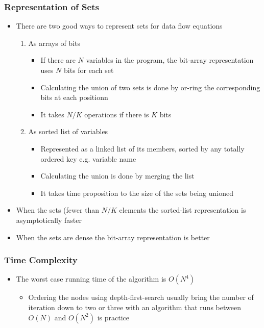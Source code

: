 \documentclass[11pt]{article}
\begin{document}
\subsubsection{Representation of Sets}
\label{sec:org340d9e2}
\begin{itemize}
\item There are two good ways to represent sets for data flow equations
\begin{enumerate}
\item As arrays of bits
\begin{itemize}
\item If there are \(N\) variables in the program, the bit-array representation uses \(N\) bits for each set
\item Calculating the union of two sets is done by or-ring the corresponding bits at each positionn
\item It takes \(N/K\) operations if there is \(K\) bits
\end{itemize}
\item As sorted list of variables
\begin{itemize}
\item Represented as a linked list of its members, sorted by any totally ordered key e.g. variable name
\item Calculating the union is done by merging the list
\item It takes time proposition to the size of the sets being unioned
\end{itemize}
\end{enumerate}

\item When the sets (fewer than \(N/K\) elements the sorted-list representation is asymptotically faster
\item When the sets are dense the bit-array representation is better
\end{itemize}

\subsubsection{Time Complexity}
\label{sec:org16e65cb}
\begin{itemize}
\item The worst case running time of the algorithm is \(O(N^4 )\)
\begin{itemize}
\item Ordering the nodes using depth-first-search usually bring the number of iteration down to two or three with an algorithm that runs between \(O(N)\) and \(O(N^2)\) is practice
\end{itemize}
\end{itemize}
\end{document}
